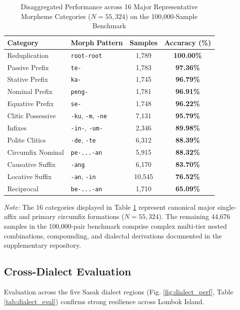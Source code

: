 \documentclass[journal,10pt]{IEEEtran}
\begin{document}
\begin{table}[htbp]
\caption{Disaggregated Performance across 16 Major Representative Morpheme Categories ($N = 55,324$) on the 100,000-Sample Benchmark}
\label{tab:morpheme_acc}
\centering
\begin{tabular}{|l|l|c|c|}
\hline
\textbf{Category} & \textbf{Morph Pattern} & \textbf{Samples} & \textbf{Accuracy (\%)} \\ \hline
Reduplication     & \texttt{root-root}     & 1,789  & \textbf{100.00\%} \\ \hline
Passive Prefix    & \texttt{te-}           & 1,783  & \textbf{97.36\%}  \\ \hline
Stative Prefix    & \texttt{ka-}           & 1,745  & \textbf{96.79\%}  \\ \hline
Nominal Prefix    & \texttt{peng-}         & 1,781  & \textbf{96.91\%}  \\ \hline
Equative Prefix   & \texttt{se-}           & 1,748  & \textbf{96.22\%}  \\ \hline
Clitic Possessive & \texttt{-ku}, \texttt{-m}, \texttt{-ne} & 7,131 & \textbf{95.79\%} \\ \hline
Infixes           & \texttt{-in-}, \texttt{-um-} & 2,346 & \textbf{89.98\%} \\ \hline
Polite Clitics    & \texttt{-de}, \texttt{-te} & 6,312 & \textbf{88.39\%} \\ \hline
Circumfix Nominal & \texttt{pe-...-an}     & 5,915  & \textbf{88.32\%}  \\ \hline
Causative Suffix  & \texttt{-ang}          & 6,170  & \textbf{83.70\%}  \\ \hline
Locative Suffix   & \texttt{-an}, \texttt{-in} & 10,545 & \textbf{76.52\%} \\ \hline
Reciprocal        & \texttt{be-...-an}     & 1,710  & \textbf{65.09\%}  \\ \hline
\end{tabular}
\vspace{2pt}

\noindent\footnotesize{\textit{Note:} The 16 categories displayed in Table \ref{tab:morpheme_acc} represent canonical major single-affix and primary circumfix formations ($N = 55,324$). The remaining 44,676 samples in the 100,000-pair benchmark comprise complex multi-tier nested combinations, compounding, and dialectal derivations documented in the supplementary repository.}
\end{table}

\subsection{Cross-Dialect Evaluation}
Evaluation across the five Sasak dialect regions (Fig. \ref{fig:dialect_perf}, Table \ref{tab:dialect_eval}) confirms strong resilience across Lombok Island.
\end{document}
